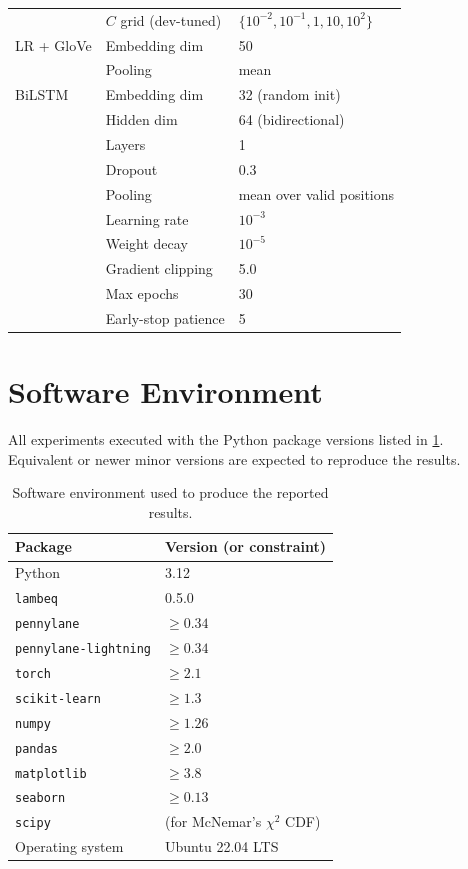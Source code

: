 \documentclass[runningheads]{llncs}
\begin{document}
\begin{table}[h!]
\begin{tabular}{lll}
              & \(C\) grid (dev-tuned) & \(\{10^{-2}, 10^{-1}, 1, 10, 10^{2}\}\) \\
LR + GloVe    & Embedding dim & 50 \\
              & Pooling & mean \\
BiLSTM        & Embedding dim & 32 (random init) \\
              & Hidden dim & 64 (bidirectional) \\
              & Layers & 1 \\
              & Dropout & 0.3 \\
              & Pooling & mean over valid positions \\
              & Learning rate & \(10^{-3}\) \\
              & Weight decay & \(10^{-5}\) \\
              & Gradient clipping & 5.0 \\
              & Max epochs & 30 \\
              & Early-stop patience & 5 \\
\bottomrule
\end{tabular}
\end{table}

\section{Software Environment}\label{app:software}

All experiments executed with the Python package versions listed in
\cref{tab:software}. Equivalent or newer minor versions are expected to
reproduce the results.

\begin{table}[h!]
\centering
\caption{Software environment used to produce the reported results.}
\label{tab:software}
\begin{tabular}{ll}
\toprule
Package & Version (or constraint) \\
\midrule
Python & 3.12 \\
\texttt{lambeq} & 0.5.0 \\
\texttt{pennylane} & \(\geq 0.34\) \\
\texttt{pennylane-lightning} & \(\geq 0.34\) \\
\texttt{torch} & \(\geq 2.1\) \\
\texttt{scikit-learn} & \(\geq 1.3\) \\
\texttt{numpy} & \(\geq 1.26\) \\
\texttt{pandas} & \(\geq 2.0\) \\
\texttt{matplotlib} & \(\geq 3.8\) \\
\texttt{seaborn} & \(\geq 0.13\) \\
\texttt{scipy} & (for McNemar's \(\chi^2\) CDF) \\
Operating system & Ubuntu 22.04 LTS \\
\bottomrule
\end{tabular}
\end{table}
\end{document}
